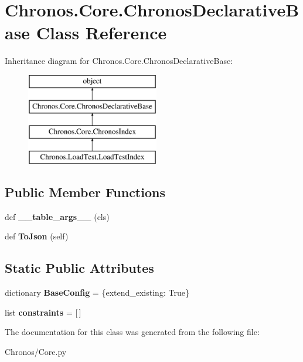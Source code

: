 \hypertarget{classChronos_1_1Core_1_1ChronosDeclarativeBase}{}\section{Chronos.\+Core.\+Chronos\+Declarative\+Base Class Reference}
\label{classChronos_1_1Core_1_1ChronosDeclarativeBase}
Inheritance diagram for Chronos.\+Core.\+Chronos\+Declarative\+Base\+:\begin{figure}[H]
\begin{center}
\leavevmode
\includegraphics[height=4.000000cm]{classChronos_1_1Core_1_1ChronosDeclarativeBase}
\end{center}
\end{figure}
\subsection*{Public Member Functions}
\begin{DoxyCompactItemize}
\item 
def {\bfseries \+\_\+\+\_\+table\+\_\+args\+\_\+\+\_\+} (cls)
\item 
def {\bfseries To\+Json} (self)
\end{DoxyCompactItemize}
\subsection*{Static Public Attributes}
\begin{DoxyCompactItemize}
\item 
dictionary {\bfseries Base\+Config} = \{\textquotesingle{}extend\+\_\+existing\textquotesingle{}\+: True\}
\item 
list {\bfseries constraints} = \mbox{[}$\,$\mbox{]}
\end{DoxyCompactItemize}


The documentation for this class was generated from the following file\+:\begin{DoxyCompactItemize}
\item 
Chronos/Core.\+py\end{DoxyCompactItemize}
